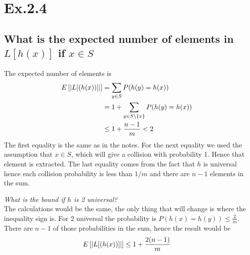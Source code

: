 \section*{Ex.2.4}
\subsection*{What is the expected number of elements in $L[h(x)]$ if $x \in S$}

The expected number of elements is
\begin{align*}
E\left[ \abs*{L[(h(x))]} \right] 
       &= \sum_{y\in S} P(h(y) = h(x)) \\
       &= 1 + \sum_{y\in S\backslash\{x\}} P(h(y) = h(x)) \\
       &\leq 1 + \frac{n-1}{m} < 2
\end{align*}
The first equality is the same as in the notes. For the next equality we used the assumption that $x\in S$, which will give a collision with probability 1. Hence that element is extracted. The last equality comes from the fact that $h$ is universal hence each collision probability is less than $1/m$ and there are $n-1$ elements in the sum.

\emph{What is the bound if $h$ is 2 universal?}
\\
The calculations would be the same, the only thing that will change is where the inequality sign is. For 2 universal the probability is $P(h(x)=h(y))\leq \frac{2}{m}$. There are $n-1$ of those probabilities in the sum, hence the result would be
$$
E\left[ \abs*{L[(h(x))]} \right]  \leq 1 + \frac{2(n-1)}{m}
$$